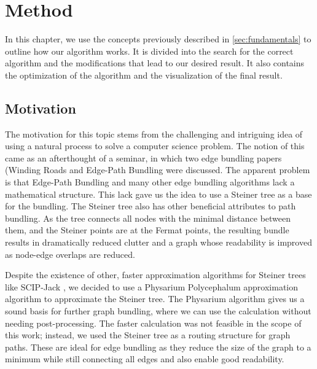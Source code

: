 
\chapter{Method}
\label{sec:method}

In this chapter, we use the concepts previously described in \autoref{sec:fundamentals} to outline how our algorithm works. It is divided into the search for the correct algorithm and the modifications that lead to our desired result. It also contains the optimization of the algorithm and the visualization of the final result.

\section{Motivation}
\label{sec:motivation}
The motivation for this topic stems from the challenging and intriguing idea of using a natural process to solve a computer science problem. The notion of this came as an afterthought of a seminar, in which two edge bundling papers (Winding Roads \cite{lambert_winding_2010} and Edge-Path Bundling \cite{wallinger_edge-path_2022} were discussed. The apparent problem is that Edge-Path Bundling and many other edge bundling algorithms lack a mathematical structure. This lack gave us the idea to use a Steiner tree as a base for the bundling. The Steiner tree also has other beneficial attributes to path bundling. As the tree connects all nodes with the minimal distance between them, and the Steiner points are at the Fermat points, the resulting bundle results in dramatically reduced clutter and a graph whose readability is improved as node-edge overlaps are reduced. 

Despite the existence of other, faster approximation algorithms for Steiner trees like SCIP-Jack \cite{RehfeldtKoch2023}, we decided to use a Physarium Polycephalum approximation algorithm to approximate the Steiner tree. The Physarium algorithm gives us a sound basis for further graph bundling, where we can use the calculation without needing post-processing. The faster calculation was not feasible in the scope of this work; instead, we used the Steiner tree as a routing structure for graph paths. These are ideal for edge bundling as they reduce the size of the graph to a minimum while still connecting all edges and also enable good readability. 

